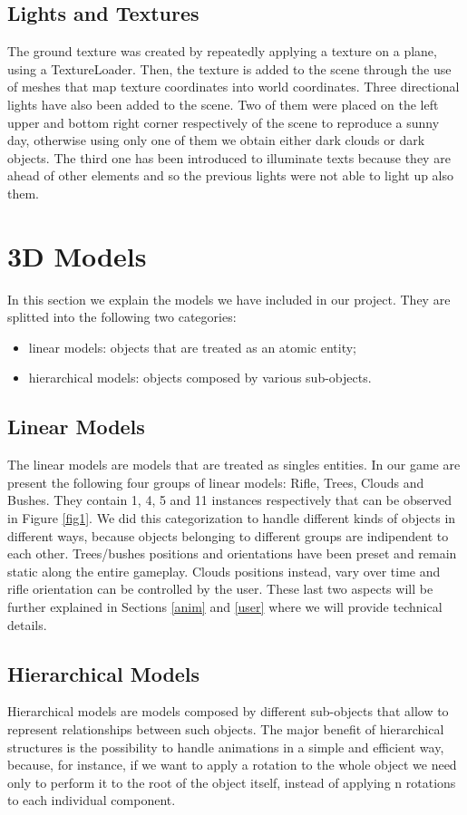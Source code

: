 \documentclass[12pt,a4paper]{article}
\begin{document}
\subsection{Lights and Textures}
The ground texture was created by repeatedly applying a texture on 
a plane, using a TextureLoader. Then, the texture is added to the
scene through the use of meshes that map texture coordinates into
world coordinates.
Three directional lights have also been added to the scene. 
Two of them were placed on the left upper and bottom right corner 
respectively of the scene to reproduce a sunny day, otherwise using
only one of them we obtain either dark clouds or dark objects. 
The third one has been introduced to illuminate texts because they 
are ahead of other elements and so the previous lights were
not able to light up also them.
\section{3D Models}
In this section we explain the models we have included in our project. They are splitted into
the following two categories: 
\begin{itemize}
\item linear models: objects that are treated as an atomic entity;
\item hierarchical models: objects composed by various sub-objects. 
\end{itemize}
\subsection{Linear Models} \label{linear}
The linear models are models that are treated as singles entities. In our game are present the following four groups of linear models: Rifle, Trees, Clouds and Bushes. They contain 1, 4, 5 and 11 instances respectively that can be observed in Figure \ref{fig1}. We did this categorization to handle different kinds of objects in different ways, because objects belonging to different groups are indipendent to each other. Trees/bushes positions and orientations have been preset and remain static along the entire gameplay. Clouds positions instead, vary over time and rifle orientation can be controlled by the user. These last two aspects will be further explained in Sections \ref{anim} and \ref{user} where we will provide technical details.
\subsection{Hierarchical Models}
Hierarchical models are models composed by different sub-objects that allow to represent relationships between such objects. The major benefit of hierarchical structures is the possibility to handle animations in a simple and efficient way, because, for instance, if we want to apply a rotation to the whole object we need only to perform it to the root of the object itself, instead of applying n rotations to each individual component.
\end{document}
